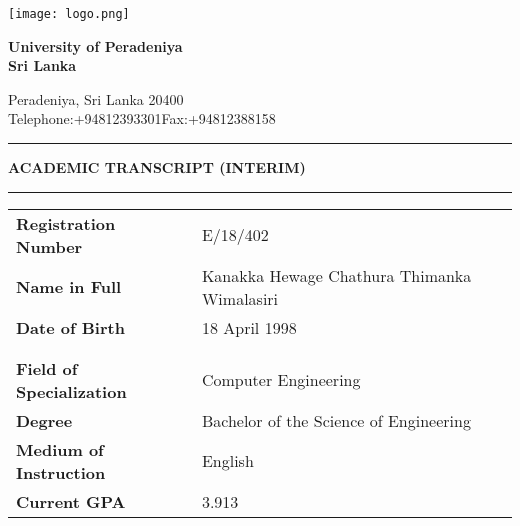 \documentclass[12pt]{article}
\begin{document}
\noindent
\begin{minipage}[H]{0.17\linewidth}
\centering
\texttt{[image: logo.png]}
\end{minipage}%
\hfill
  \begin{minipage}[H]{0.8\linewidth}
{\fontsize{28}{30}\selectfont \textbf{University of Peradeniya\\Sri Lanka}}

\Large Peradeniya, Sri Lanka 20400\\
{\fontsize{12}{30}\selectfont Telephone:+94812393301\hfill Fax:+94812388158}


  \end{minipage}

\vspace{10pt}
\noindent\rule{\textwidth}{1pt}
\vspace{-15pt}
\begin{center}
{\fontsize{21}{30}\selectfont \textbf{ACADEMIC TRANSCRIPT (INTERIM)}}
\end{center}

\vspace{-12.5pt}

\noindent\rule{\textwidth}{1pt}

\begin{table}[H]
\begin{tabularx}{\textwidth}{Xl}
\textbf{Registration Number} & E/18/402 \\
\textbf{Name in Full} & Kanakka Hewage Chathura Thimanka Wimalasiri \\
\textbf{Date of Birth} & 18 April 1998 \\
\\
\\

\textbf{Field of Specialization} & Computer Engineering \\
\textbf{Degree} & Bachelor of the Science of Engineering \\
\textbf{Medium of Instruction} & English \\
\textbf{Current GPA} & 3.913 \\
\end{tabularx}
\end{table}
\end{document}
